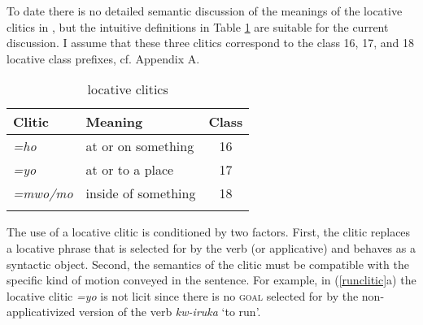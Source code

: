 \documentclass[output=paper]{langsci/langscibook}
\begin{document}
To date there is no detailed semantic discussion of the meanings of the locative clitics in , but the intuitive definitions in Table \ref{tab:clitic} are suitable for the current discussion. I assume that these three clitics correspond to the class 16, 17, and 18 locative class prefixes, cf. Appendix A.  


\begin{table}
\caption{ { locative clitics}}
      \begin{tabular}[t]{llc}
\lsptoprule
	      Clitic			& Meaning				& Class \\
\midrule
			\emph{=ho}  & at or on something	& 16 \\
		      
		\emph{=yo} 	&  at or to a place 		& 17 \\

		\emph{=mwo/mo}  &  inside of something & 18\\
      
      \lspbottomrule
	\end{tabular}
\label{tab:clitic} 
\end{table}
 

The use of a locative clitic is conditioned by two factors. First, the clitic replaces a locative phrase that is selected for by the verb (or applicative) and behaves as a syntactic object. Second, the semantics of the clitic must be compatible with the specific kind of motion conveyed in the sentence.  For example, in (\ref{runclitic}a) the locative clitic \emph{=yo} is not licit since there is no {\scshape goal}  selected for by the non-applicativized version of the verb \emph{kw-iruka} `to run'. 
\end{document}
